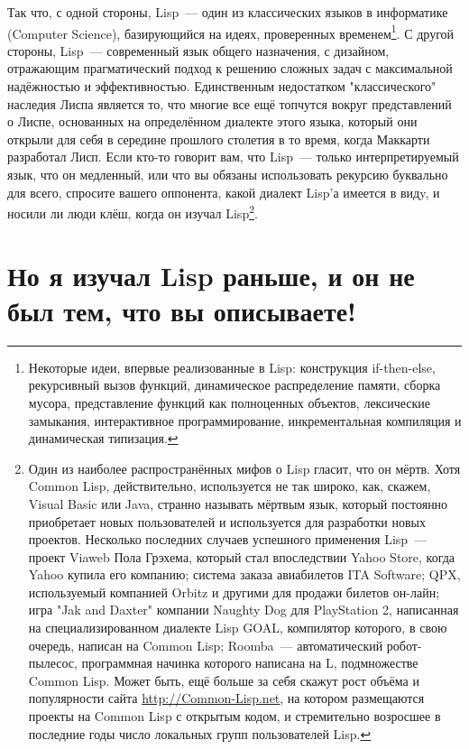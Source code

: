 Так что, с одной стороны, Lisp~--- один из классических языков в информатике (Computer
Science), базирующийся на идеях, проверенных временем\footnote{Некоторые идеи, впервые
  реализованные в Lisp: конструкция if-then-else, рекурсивный вызов функций, динамическое
  распределение памяти, сборка мусора, представление функций как полноценных объектов,
  лексические замыкания, интерактивное программирование, инкрементальная компиляция и
  динамическая типизация.}. С другой стороны, Lisp~--- современный язык общего назначения,
с дизайном, отражающим прагматический подход к решению сложных задач с максимальной
надёжностью и эффективностью. Единственным недостатком "классического" наследия Лиспа
является то, что многие все ещё топчутся вокруг представлений о Лиспе, основанных на
определённом диалекте этого языка, который они открыли для себя в середине прошлого
столетия в то время, когда Маккарти разработал Лисп. Если кто-то говорит вам, что Lisp~---
только интерпретируемый язык, что он медленный, или что вы обязаны использовать рекурсию
буквально для всего, спросите вашего оппонента, какой диалект Lisp'а имеется в видy, и
носили ли люди клёш, когда он изучал Lisp\footnote{Один из наиболее распространённых мифов
  о Lisp гласит, что он мёртв. Хотя Common Lisp, действительно, используется не так
  широко, как, скажем, Visual Basic или Java, странно называть мёртвым язык, который
  постоянно приобретает новых пользователей и используется для разработки новых
  проектов. Несколько последних случаев успешного применения Lisp~--- проект Viaweb Пола
  Грэхема, который стал впоследствии Yahoo Store, когда Yahoo купила его компанию; система
  заказа авиабилетов ITA Software; QPX, используемый компанией Orbitz и другими для
  продажи билетов он-лайн; игра "Jak and Daxter" компании Naughty Dog для PlayStation 2,
  написанная на специализированном диалекте Lisp GOAL, компилятор которого, в свою
  очередь, написан на Common Lisp; Roomba~--- автоматический робот-пылесос, программная
  начинка которого написана на L, подмножестве Common Lisp. Может быть, ещё больше за себя
  скажут рост объёма и популярности сайта \url{http://Common-Lisp.net}, на котором
  размещаются проекты на Common Lisp с открытым кодом, и стремительно возросшее в
  последние годы число локальных групп пользователей Lisp.}.

\section{Но я изучал Lisp раньше, и он не был тем, что вы описываете!}

